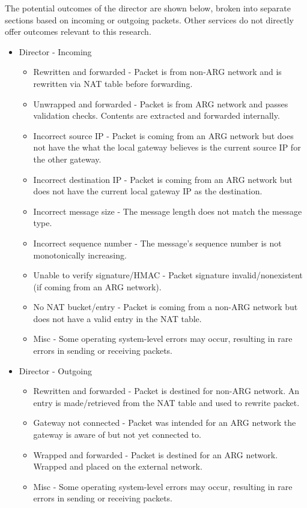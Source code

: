 \par The potential outcomes of the director are shown below, broken into separate sections based on incoming or outgoing packets. Other services do not directly offer outcomes relevant to this research.

\begin{itemize}
\item Director - Incoming
	\begin{itemize}
	\item Rewritten and forwarded - Packet is from non-\ac{ARG} network and is rewritten via \ac{NAT} table before forwarding.
	\item Unwrapped and forwarded - Packet is from \ac{ARG} network and passes validation checks. Contents are extracted and forwarded internally.

	\item Incorrect source \ac{IP} - Packet is coming from an \ac{ARG} network but does not have the what the local gateway believes is the current source IP for the other gateway.
	\item Incorrect destination \ac{IP} - Packet is coming from an \ac{ARG} network but does not have the current local gateway \ac{IP} as the destination.
	\item Incorrect message size - The message length does not match the message type.
	\item Incorrect sequence number - The message's sequence number is not monotonically increasing. 
	\item Unable to verify signature/\ac{HMAC} - Packet signature invalid/nonexistent (if coming from an \ac{ARG} network).
	\item No \ac{NAT} bucket/entry - Packet is coming from a non-\ac{ARG} network but does not have a valid entry in the \ac{NAT} table.

	\item Misc - Some operating system-level errors may occur, resulting in rare errors in sending or receiving packets.
	\end{itemize}

\item Director - Outgoing
	\begin{itemize}
	\item Rewritten and forwarded - Packet is destined for non-\ac{ARG} network. An entry is made/retrieved from the \ac{NAT} table and used to rewrite packet.

	\item Gateway not connected - Packet was intended for an ARG network the gateway is aware of but not yet connected to.
	\item Wrapped and forwarded - Packet is destined for an \ac{ARG} network. Wrapped and placed on the external network.

	\item Misc - Some operating system-level errors may occur, resulting in rare errors in sending or receiving packets.
	\end{itemize}
\end{itemize}

